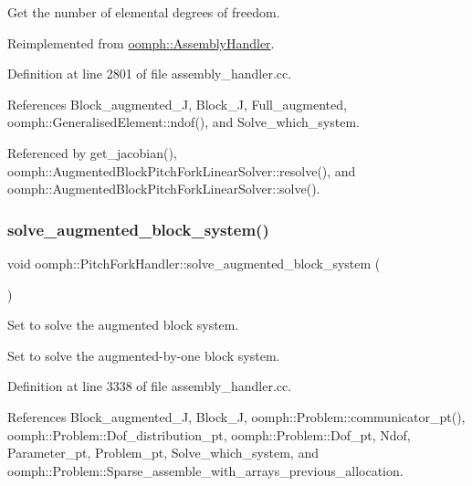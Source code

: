 Get the number of elemental degrees of freedom. 



Reimplemented from \hyperlink{classoomph_1_1AssemblyHandler_a09213be8f4aa009e0366460a7ed78e68}{oomph\+::\+Assembly\+Handler}.



Definition at line 2801 of file assembly\+\_\+handler.\+cc.



References Block\+\_\+augmented\+\_\+J, Block\+\_\+J, Full\+\_\+augmented, oomph\+::\+Generalised\+Element\+::ndof(), and Solve\+\_\+which\+\_\+system.



Referenced by get\+\_\+jacobian(), oomph\+::\+Augmented\+Block\+Pitch\+Fork\+Linear\+Solver\+::resolve(), and oomph\+::\+Augmented\+Block\+Pitch\+Fork\+Linear\+Solver\+::solve().

\mbox{\label{classoomph_1_1PitchForkHandler_ad0b0920383bcbdab5df1f43db5affa47}} 
\subsubsection{\texorpdfstring{solve\+\_\+augmented\+\_\+block\+\_\+system()}{solve\_augmented\_block\_system()}}
{\footnotesize\ttfamily void oomph\+::\+Pitch\+Fork\+Handler\+::solve\+\_\+augmented\+\_\+block\+\_\+system (\begin{DoxyParamCaption}{ }\end{DoxyParamCaption})}



Set to solve the augmented block system. 

Set to solve the augmented-\/by-\/one block system. 

Definition at line 3338 of file assembly\+\_\+handler.\+cc.



References Block\+\_\+augmented\+\_\+J, Block\+\_\+J, oomph\+::\+Problem\+::communicator\+\_\+pt(), oomph\+::\+Problem\+::\+Dof\+\_\+distribution\+\_\+pt, oomph\+::\+Problem\+::\+Dof\+\_\+pt, Ndof, Parameter\+\_\+pt, Problem\+\_\+pt, Solve\+\_\+which\+\_\+system, and oomph\+::\+Problem\+::\+Sparse\+\_\+assemble\+\_\+with\+\_\+arrays\+\_\+previous\+\_\+allocation.



